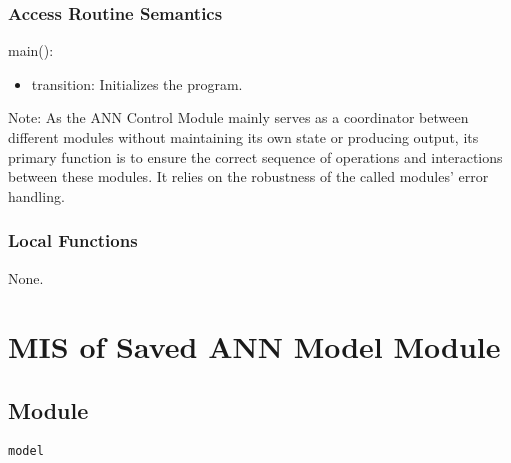 \documentclass[12pt, titlepage]{article}
\def\code#1{\texttt{#1}}
\begin{document}

\subsubsection{Access Routine Semantics}

\noindent main():
\begin{itemize}
  \item transition: Initializes the program.
\end{itemize}

Note: As the ANN Control Module mainly serves as a coordinator between different modules 
without maintaining its own state or producing output, its primary function is to ensure 
the correct sequence of operations and interactions between these modules. It relies on 
the robustness of the called modules' error handling.




\subsubsection{Local Functions}
None.


\section{MIS of Saved ANN Model Module} \label{SavedANN} 

\subsection{Module}
\code{model} 
\end{document}
